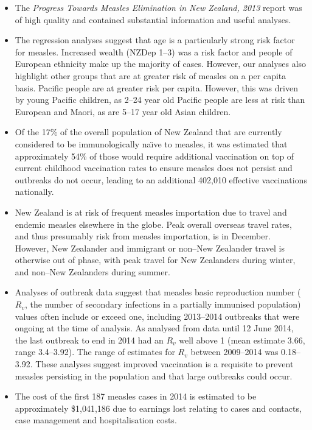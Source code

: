 \documentclass{article}
\begin{document}
\begin{itemize}
\item The \emph {Progress Towards Measles Elimination in New Zealand, 2013} report was of high quality and contained substantial information and useful analyses.
\item The regression analyses suggest that age is a particularly strong risk factor for measles.  Increased wealth (NZDep 1--3) was a risk factor and people of European ethnicity make up the majority of cases. However, our analyses also highlight other groups that are at greater risk of measles on a per capita basis. Pacific people are at greater risk per capita. However, this was driven by young Pacific children, as 2--24 year old Pacific people are less at risk than European and Maori, as are 5--17 year old Asian children.
\item Of the 17\% of the overall population of New Zealand that are currently considered to be immunologically na\"{\i}ve to measles, it was estimated that approximately 54\% of those would require additional vaccination on top of current childhood vaccination rates to ensure measles does not persist and outbreaks do not occur, leading to an additional 402,010 effective vaccinations nationally.
\item New Zealand is at risk of frequent measles importation due to travel and endemic measles elsewhere in the globe. Peak overall overseas travel rates, and thus presumably risk from measles importation, is in December. However, New Zealander and immigrant or non--New Zealander travel is otherwise out of phase, with peak travel for New Zealanders during winter, and non--New Zealanders during summer.
\item Analyses of outbreak data suggest that measles basic reproduction number ($R_v$, the number of secondary infections in a partially immunised population) values often include or exceed one, including 2013--2014 outbreaks that were ongoing at the time of analysis. As analysed from data until 12 June 2014, the last outbreak to end in 2014 had an $R_v$ well above 1 (mean estimate 3.66, range 3.4--3.92). The range of estimates for $R_v$ between 2009--2014 was 0.18--3.92. These analyses suggest improved vaccination is a requisite to prevent measles persisting in the population and that large outbreaks could occur.
\item The cost of the first 187 measles cases in 2014 is estimated to be approximately \$1,041,186 due to earnings lost relating to cases and contacts, case management and hospitalisation costs.

\end{itemize}
\end{document}
